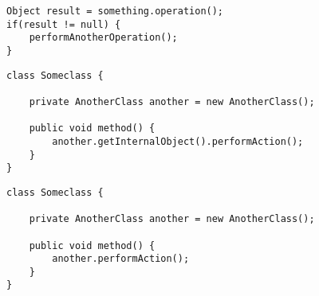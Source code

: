 













\begin{lstlisting}[caption=null check]
Object result = something.operation();
if(result != null) {
	performAnotherOperation();
}
\end{lstlisting}
\label{listing:nullcheck}

\begin{lstlisting}[caption=\textit{method()} is violating \ac{LoD}]
class Someclass {

	private AnotherClass another = new AnotherClass();

	public void method() {
		another.getInternalObject().performAction();
	}
}
\end{lstlisting}
\label{listing:lodbadexample}

\begin{lstlisting}[caption=\textit{method()} is not violating \ac{LoD}]
class Someclass {

	private AnotherClass another = new AnotherClass();

	public void method() {
		another.performAction();
	}
}
\end{lstlisting}
\label{listing:lodgoodexample}

